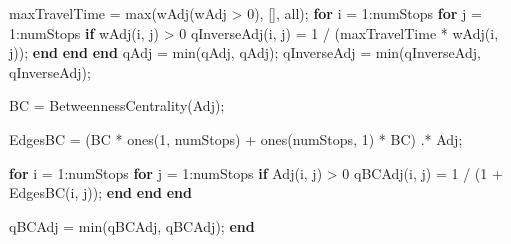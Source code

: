 \documentclass[
  letterpaper,
  DIV=11,
  numbers=noendperiod]{scrartcl}
\newenvironment{Shaded}{\begin{snugshade}}{\end{snugshade}}
\newcommand{\FloatTok}[1]{\textcolor[rgb]{0.68,0.00,0.00}{#1}}
\newcommand{\KeywordTok}[1]{\textcolor[rgb]{0.00,0.23,0.31}{\textbf{#1}}}
\newcommand{\NormalTok}[1]{\textcolor[rgb]{0.00,0.23,0.31}{#1}}
\newcommand{\OperatorTok}[1]{\textcolor[rgb]{0.37,0.37,0.37}{#1}}
\newcommand{\SpecialStringTok}[1]{\textcolor[rgb]{0.13,0.47,0.30}{#1}}
\newcommand{\VariableTok}[1]{\textcolor[rgb]{0.07,0.07,0.07}{#1}}
\begin{document}
\begin{Shaded}
\begin{Highlighting}[]
    \VariableTok{maxTravelTime} \OperatorTok{=} \VariableTok{max}\NormalTok{(}\VariableTok{wAdj}\NormalTok{(}\VariableTok{wAdj} \OperatorTok{\textgreater{}} \FloatTok{0}\NormalTok{)}\OperatorTok{,}\NormalTok{ []}\OperatorTok{,} \SpecialStringTok{\textquotesingle{}all\textquotesingle{}}\NormalTok{)}\OperatorTok{;}
    \KeywordTok{for} \VariableTok{i} \OperatorTok{=} \FloatTok{1}\OperatorTok{:}\VariableTok{numStops}
        \KeywordTok{for} \VariableTok{j} \OperatorTok{=} \FloatTok{1}\OperatorTok{:}\VariableTok{numStops}
            \KeywordTok{if} \VariableTok{wAdj}\NormalTok{(}\VariableTok{i}\OperatorTok{,} \VariableTok{j}\NormalTok{) }\OperatorTok{\textgreater{}} \FloatTok{0}
                \VariableTok{qInverseAdj}\NormalTok{(}\VariableTok{i}\OperatorTok{,} \VariableTok{j}\NormalTok{) }\OperatorTok{=} \FloatTok{1} \OperatorTok{/}\NormalTok{ (}\VariableTok{maxTravelTime} \OperatorTok{*} \VariableTok{wAdj}\NormalTok{(}\VariableTok{i}\OperatorTok{,} \VariableTok{j}\NormalTok{))}\OperatorTok{;}
            \KeywordTok{end}
        \KeywordTok{end}
    \KeywordTok{end}
    \VariableTok{qAdj} \OperatorTok{=} \VariableTok{min}\NormalTok{(}\VariableTok{qAdj}\OperatorTok{,} \VariableTok{qAdj}\OperatorTok{\textquotesingle{}}\NormalTok{)}\OperatorTok{;}
    \VariableTok{qInverseAdj} \OperatorTok{=} \VariableTok{min}\NormalTok{(}\VariableTok{qInverseAdj}\OperatorTok{,} \VariableTok{qInverseAdj}\OperatorTok{\textquotesingle{}}\NormalTok{)}\OperatorTok{;}

    \VariableTok{BC} \OperatorTok{=} \VariableTok{BetweennessCentrality}\NormalTok{(}\VariableTok{Adj}\NormalTok{)}\OperatorTok{;}

    \VariableTok{EdgesBC} \OperatorTok{=}\NormalTok{ (}\VariableTok{BC} \OperatorTok{*} \VariableTok{ones}\NormalTok{(}\FloatTok{1}\OperatorTok{,} \VariableTok{numStops}\NormalTok{) }\OperatorTok{+} \VariableTok{ones}\NormalTok{(}\VariableTok{numStops}\OperatorTok{,} \FloatTok{1}\NormalTok{) }\OperatorTok{*} \VariableTok{BC}\OperatorTok{\textquotesingle{}}\NormalTok{) }\OperatorTok{.*} \VariableTok{Adj}\OperatorTok{;}

    \KeywordTok{for} \VariableTok{i} \OperatorTok{=} \FloatTok{1}\OperatorTok{:}\VariableTok{numStops}
        \KeywordTok{for} \VariableTok{j} \OperatorTok{=} \FloatTok{1}\OperatorTok{:}\VariableTok{numStops}
            \KeywordTok{if} \VariableTok{Adj}\NormalTok{(}\VariableTok{i}\OperatorTok{,} \VariableTok{j}\NormalTok{) }\OperatorTok{\textgreater{}} \FloatTok{0}
                \VariableTok{qBCAdj}\NormalTok{(}\VariableTok{i}\OperatorTok{,} \VariableTok{j}\NormalTok{) }\OperatorTok{=} \FloatTok{1} \OperatorTok{/}\NormalTok{ (}\FloatTok{1} \OperatorTok{+} \VariableTok{EdgesBC}\NormalTok{(}\VariableTok{i}\OperatorTok{,} \VariableTok{j}\NormalTok{))}\OperatorTok{;}
            \KeywordTok{end}
        \KeywordTok{end}
    \KeywordTok{end}

    \VariableTok{qBCAdj} \OperatorTok{=} \VariableTok{min}\NormalTok{(}\VariableTok{qBCAdj}\OperatorTok{,} \VariableTok{qBCAdj}\OperatorTok{\textquotesingle{}}\NormalTok{)}\OperatorTok{;}
\KeywordTok{end}
\end{Highlighting}
\end{Shaded}
\end{document}
